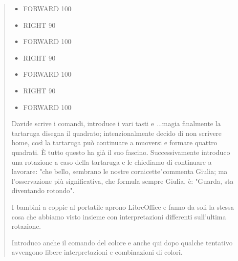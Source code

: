 \begin{quote}
\begin{minipage}{1.0\textwidth}
\begin{itemize}[itemsep=-3pt,parsep=2pt]
\item[] \hspace{8pt}FORWARD 100
\item[] \hspace{8pt}RIGHT 90   
\item[] \hspace{8pt}FORWARD 100  
\item[] \hspace{8pt}RIGHT 90     
\item[] \hspace{8pt}FORWARD 100  
\item[] \hspace{8pt}RIGHT 90     
\item[] \hspace{8pt}FORWARD 100 
\end{itemize}          	          
\end{minipage}

\vskip 1cm

Davide scrive i comandi, introduce i vari tasti e ...magia finalmente la tartaruga disegna il quadrato; intenzionalmente decido di non scrivere home, così la tartaruga può continuare a muoversi e formare quattro quadrati. È tutto questo ha già il suo fascino. Successivamente introduco una rotazione a caso della tartaruga e le chiediamo di continuare a lavorare: "che bello, sembrano le nostre cornicette"commenta Giulia; ma l'osservazione più significativa, che formula sempre Giulia, è: "Guarda, sta diventando rotondo". 

I bambini a coppie al portatile aprono LibreOffice e fanno da soli la stessa cosa che abbiamo visto insieme con interpretazioni differenti sull'ultima rotazione. 

Introduco anche il comando del colore e anche qui dopo qualche tentativo avvengono libere interpretazioni e combinazioni di colori.


\end{quote}
